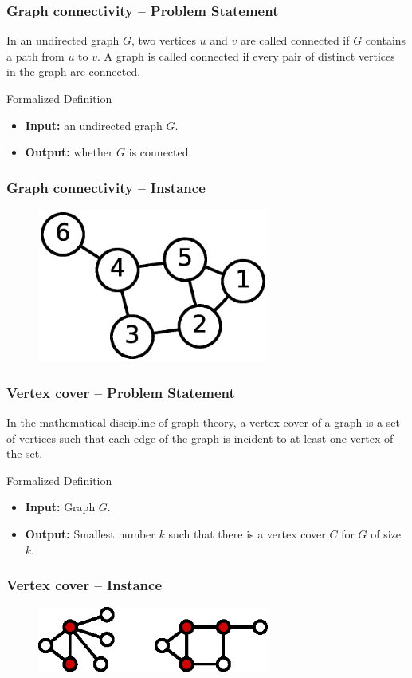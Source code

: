 \documentclass[slidestop,compress,mathserif]{beamer}
\begin{document}

\frame
{
  \frametitle{Graph connectivity -- Problem Statement}
  In an undirected graph $G$, two vertices $u$ and $v$ are called connected if $G$ contains a path from $u$ to $v$. A graph is called connected if every pair of distinct vertices in the graph are connected.
  \begin{block}{Formalized Definition}
  \begin{itemize}
  \item {\bf Input:} an undirected graph $G$.
  \item {\bf Output:} whether $G$ is connected.
  \end{itemize}
  \end{block}
}
\frame
{
  \frametitle{Graph connectivity -- Instance}
  \begin{figure}
  \includegraphics[width=3in]{connectivity.eps}
  \end{figure}
}
\frame
{
  \frametitle{Vertex cover -- Problem Statement}
  In the mathematical discipline of graph theory, a vertex cover of a graph is a set of vertices such that each edge of the graph is incident to at least one vertex of the set.
  \begin{block}{Formalized Definition}
  \begin{itemize}
  \item {\bf Input:} Graph $G$.
  \item {\bf Output:} Smallest number $k$ such that there is a vertex cover $C$ for $G$ of size $k$.
  \end{itemize}
  \end{block}
}
\frame
{
  \frametitle{Vertex cover -- Instance}
  \begin{figure}
  \includegraphics[width=3in]{Minimum-vertex-cover.eps}
  \end{figure}
}
\end{document}
